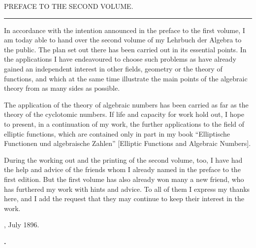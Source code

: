 \begin{center}
{\large PREFACE TO THE SECOND VOLUME.}

\vspace{8pt}
\rule{2.5cm}{0.4pt}
\end{center}

\vspace{6pt}

In accordance with the intention announced in the preface to the first volume, I am today able to hand over the second volume of my Lehrbuch der Algebra to the public. The plan set out there has been carried out in its essential points. In the applications I have endeavoured to choose such problems as have already gained an independent interest in other fields, geometry or the theory of functions, and which at the same time illustrate the main points of the algebraic theory from as many sides as possible.

The application of the theory of algebraic numbers has been carried as far as the theory of the cyclotomic numbers. If life and capacity for work hold out, I hope to present, in a continuation of my work, the further applications to the field of elliptic functions, which are contained only in part in my book ``Elliptische Functionen und algebraische Zahlen'' [Elliptic Functions and Algebraic Numbers].

During the working out and the printing of the second volume, too, I have had the help and advice of the friends whom I already named in the preface to the first edition. But the first volume has also already won many a new friend, who has furthered my work with hints and advice. To all of them I express my thanks here, and I add the request that they may continue to keep their interest in the work.

\bigskip

, July 1896.

\begin{flushright}
\textbf{.}\hspace*{2em}
\end{flushright}
